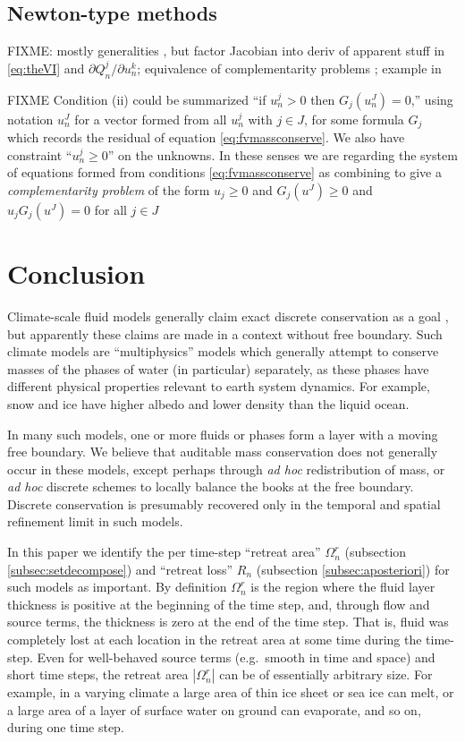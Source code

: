 \documentclass[final,leqno,onefignum,onetabnum]{siamltex1213bueler}
\begin{document}
\subsection{Newton-type methods} \label{subsec:newtonvi}  FIXME: mostly generalities \cite{Kelley2003}, but factor Jacobian into deriv of apparent stuff in \eqref{eq:theVI} and $\partial Q_n^j/\partial u_n^k$; equivalence of complementarity problems \cite{BensonMunson2006,BillupsMurty2000}; example in \cite{Bueler2016}

FIXME Condition (ii) could be summarized ``if $u_n^j>0$ then $G_j(u_n^J)=0$,'' using notation $u_n^J$ for a vector formed from all $u_n^j$ with $j\in J$, for some formula $G_j$ which records the residual of equation \eqref{eq:fvmassconserve}.  We also have constraint ``$u_n^j\ge 0$'' on the unknowns.  In these senses we are regarding the system of equations formed from conditions \eqref{eq:fvmassconserve} as combining to give a \emph{complementarity problem} \cite{BillupsMurty2000} of the form $u_j\ge 0$ and $G_j(u^J)\ge 0$ and $u_j G_j(u^J)=0$ for all $j\in J$


\section{Conclusion} \label{sec:conclusion}

Climate-scale fluid models generally claim exact discrete conservation as a goal \cite{Thuburn2008}, but apparently these claims are made in a context without free boundary.  Such climate models are ``multiphysics'' models which generally attempt to conserve masses of the phases of water (in particular) separately, as these phases have different physical properties relevant to earth system dynamics.  For example, snow and ice have higher albedo and lower density than the liquid ocean.

In many such models, one or more fluids or phases form a layer with a moving free boundary.  We believe that auditable mass conservation does not generally occur in these models, except perhaps through \emph{ad hoc} redistribution of mass, or \emph{ad hoc} discrete schemes to locally balance the books at the free boundary.  Discrete conservation is presumably recovered only in the temporal and spatial refinement limit in such models.

In this paper we identify the per time-step ``retreat area'' $\Omega_n^r$ (subsection \ref{subsec:setdecompose}) and ``retreat loss'' $R_n$ (subsection \ref{subsec:aposteriori}) for such models as important.  By definition $\Omega_n^r$ is the region where the fluid layer thickness is positive at the beginning of the time step, and, through flow and source terms, the thickness is zero at the end of the time step.  That is, fluid was completely lost at each location in the retreat area at some time during the time-step.  Even for well-behaved source terms (e.g.~smooth in time and space) and short time steps, the retreat area $|\Omega_n^r|$ can be of essentially arbitrary size.  For example, in a varying climate a large area of thin ice sheet or sea ice can melt, or a large area of a layer of surface water on ground can evaporate, and so on, during one time step.
\end{document}

